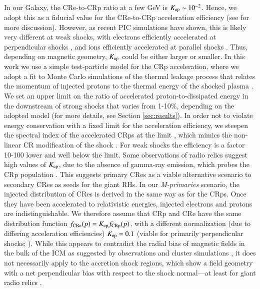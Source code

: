 \documentclass[useAMS,usenatbib]{mn2e}
\begin{document}
In our Galaxy, the CRe-to-CRp ratio at a few GeV is $K_{{\mathrm{ep}}} \sim
10^{-2}$. Hence, we adopt this as a fiducial value for the CRe-to-CRp
acceleration efficiency (see \citet{pinzke13} for more
discussion). However, as recent PIC simulations have shown, this is
likely very different at weak shocks, with electrons efficiently
accelerated at perpendicular shocks
\citep{2014ApJ...794..153G,2014ApJ...797...47G}, and ions efficiently
accelerated at parallel shocks \citep{2014ApJ...783...91C}. Thus,
depending on magnetic geometry, $K_{{\mathrm{ep}}}$ could be either larger
or smaller. In this work we use a simple test-particle model for the
CRp acceleration, where we adopt a fit to Monte Carlo simulations of
the thermal leakage process that relates the momentum of injected
protons to the thermal energy of the shocked plasma \citep{kang11}. We
set an upper limit on the ratio of accelerated proton-to-dissipated
energy in the downstream of strong shocks that varies from 1-10\%,
depending on the adopted model (for more details, see Section
\ref{sec:results}). In order not to violate energy conservation with a
fixed limit for the acceleration efficiency, we steepen the spectral
index of the accelerated CRps at the limit \citep{pinzke13}, which
mimics the non-linear CR modification of the shock
\citep{ellison00}. For weak shocks the efficiency is a factor 10-100
lower and well below the limit. Some observations of radio relics
suggest high values of $K_{{\mathrm{ep}}}$, due to the absence of gamma-ray
emission, which probes the CRp population
\citep{2014MNRAS.437.2291V}. This suggests primary CRes as a viable
alternative scenario to secondary CRes as seeds for the giant RHs. In
our {\em M-primaries} scenario, the injected distribution of CRes is
derived in the same way as for the CRps. Once they have been
accelerated to relativistic energies, injected electrons and protons
are indistinguishable. We therefore assume that CRp and CRe have the
same distribution function $f_{\mathrm{CRe}}(p) = K_{\mathrm{ep}}
f_{\mathrm{CRp}}(p)$, with a different normalization (due to differing
acceleration efficiencies) $K_{\mathrm{ep}}=0.1$ (viable for primarily
perpendicular shocks; \citet{2014ApJ...794..153G}). While this
appears to contradict the radial bias of magnetic fields in the bulk
of the ICM as suggested by observations \citep{2010NatPh...6..520P}
and cluster simulations \citep{2011ApJ...740...81R}, it does not
necessarily apply to the accretion shock regions, which show a field
geometry with a net perpendicular bias with respect to the shock
normal---at least for giant radio relics \citep{2010Sci...330..347V}.
\end{document}
